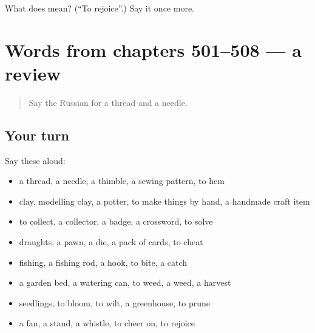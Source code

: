 \begin{tcolorbox}[breakable,colback=teal!4,colframe=teal!35!black,title={Before you move on}]
What does  mean? (\textquotedblleft{}To rejoice\textquotedblright{}.) Say it once more.
\end{tcolorbox}
\section[(dialogue)]{Words from chapters 501–508 — a review}

\label{lesson:RU-R508-review-501-508}



\begin{quote}
Say the Russian for a thread and a needle.
\end{quote}

\subsection*{Your turn}
Say these aloud:

\begin{itemize}
\raggedright
  \item a thread, a needle, a thimble, a sewing pattern, to hem
  \item clay, modelling clay, a potter, to make things by hand, a handmade craft item
  \item to collect, a collector, a badge, a crossword, to solve
  \item draughts, a pawn, a die, a pack of cards, to cheat
  \item fishing, a fishing rod, a hook, to bite, a catch
  \item a garden bed, a watering can, to weed, a weed, a harvest
  \item seedlings, to bloom, to wilt, a greenhouse, to prune
  \item a fan, a stand, a whistle, to cheer on, to rejoice
\end{itemize}

